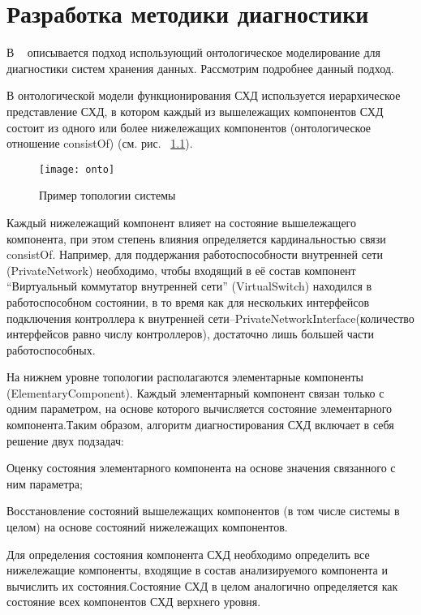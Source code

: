 

\begingroup
\renewcommand{\cleardoublepage}{}
\renewcommand{\clearpage}{}
\vspace{1em}
\chapter{Разработка методики диагностики}
\endgroup
В ~\cite{ontoapproach} описывается подход использующий онтологическое моделирование для диагностики систем хранения данных. Рассмотрим подробнее данный подход. 

В  онтологической  модели  функционирования СХД используется иерархическое представление СХД, в котором каждый из вышележащих компонентов СХД состоит из одного или более нижележащих компонентов (онтологическое отношение consistOf) (см. рис. ~\ref{fig:onto}).
\begin{figure}[h]
	\centering
	\texttt{[image: onto]}
	\caption{Пример топологии системы}
	\label{fig:onto}
\end{figure}

Каждый нижележащий компонент влияет на  состояние  вышележащего  компонента,  при  этом  степень  влияния определяется кардинальностью связи consistOf. Например, для поддержания работоспособности внутренней сети (PrivateNetwork) необходимо,  чтобы входящий  в  её  состав  компонент “Виртуальный коммутатор  внутренней  сети”  (VirtualSwitch)  находился  в  работоспособном состоянии,  в  то  время  как  для  нескольких  интерфейсов  подключения контроллера  к  внутренней  сети–PrivateNetworkInterface(количество интерфейсов  равно  числу  контроллеров),  достаточно  лишь  большей  части работоспособных.

На нижнем  уровне  топологии  располагаются  элементарные компоненты  (ElementaryComponent).  Каждый  элементарный  компонент связан  только  с  одним  параметром,  на  основе  которого вычисляется состояние элементарного компонента.Таким  образом,  алгоритм  диагностирования СХД включает  в  себя решение двух подзадач:
\begin{itemize*}
	\item{Оценку состояния  элементарного  компонента  на  основе  значения связанного с ним параметра;}
	\item{Восстановление состояний вышележащих компонентов (в том числе системы в целом) на основе состояний нижележащих компонентов.}
\end{itemize*}
Для определения состояния компонента СХД необходимо определить все  нижележащие  компоненты,  входящие  в  состав  анализируемого компонента и вычислить их состояния.Состояние СХД в целом аналогично определяется как состояние всех компонентов СХД верхнего уровня.

